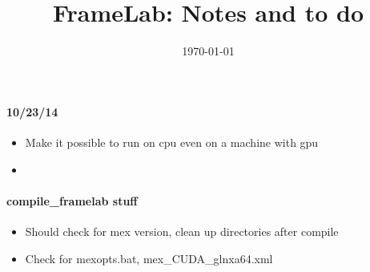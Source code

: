 \documentclass[12pt]{article}
\title{FrameLab: Notes and to do}
\date{\today}
\begin{document}
\maketitle

\paragraph{10/23/14}
\begin{itemize}
\item Make it possible to run on cpu even on a machine with gpu
\item 
\end{itemize}

\paragraph{compile\_framelab stuff}
\begin{itemize}
\item Should check for mex version, clean up directories after compile
\item Check for mexopts.bat, mex\_CUDA\_glnxa64.xml
\end{itemize}



\end{document}

